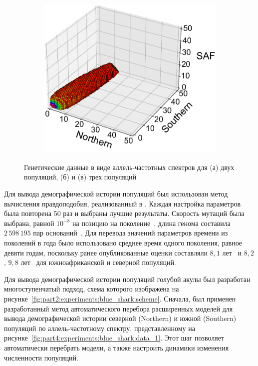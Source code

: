 \begin{figure}[ht]
\begin{subfigure}[b]{0.4\linewidth}
        \caption{}
        \label{fig:part4:experiments:blue_shark:data_2}
    \end{subfigure}%
    \begin{subfigure}[b]{0.4\linewidth}
        \centering
        \includegraphics[width=\textwidth]{images_experiments/blue_shark/3pop_afs_50.pdf}
        \caption{}
        \label{fig:part4:experiments:blue_shark:data_3}
    \end{subfigure}
    \caption{Генетические данные в виде аллель-частотных спектров для (а) двух популяций, (б) и (в) трех популяций}
    \label{fig:part4:experiments:blue_shark:data}
\end{figure}

Для вывода демографической истории популяций был использован метод вычисления правдоподобия, реализованный в \moments.
Каждая настройка параметров была повторена 50 раз и выбраны лучшие результаты.
Скорость мутаций была выбрана, равной $10^{-8}$ на позицию на поколение~\cite{pirog2018structure, duncan2006global}, длина генома составила $2{\,}598{\,}195$ пар оснований~\cite{rougeux2017modeling}.
Для перевода значений параметров времени из поколений в года было использовано среднее время одного поколения, равное девяти годам, поскольку ранее опубликованные оценки составляли $8{,}1$ лет~\cite{poisson2007compilation} и $8{,}2$, $9{,}8$ лет~\cite{cortes2010ecological} для южноафриканской и северной популяций.

Для вывода демографической истории популяций голубой акулы был разработан многоступенчатый подход, схема которого изображена на рисунке~\ref{fig:part2:experiments:blue_shark:scheme}.
Сначала, был применен разработанный метод автоматического перебора расширенных моделей для вывода демографической истории северной (Northern) и южной (Southern) популяций по аллель-частотному спектру, представленному на рисунке~\ref{fig:part4:experiments:blue_shark:data_1}.
Этот шаг позволяет автоматически перебрать модели, а также настроить динамики изменения численности популяций.

